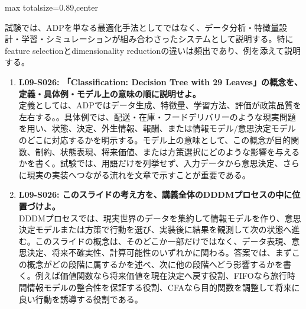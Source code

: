 \begin{minipage}[t]{0.58\textwidth}
\begin{adjustbox}{max totalsize={\textwidth}{0.89\textheight},center}
\begin{minipage}{\textwidth}
試験では、ADPを単なる最適化手法としてではなく、データ分析・特徴量設計・学習・シミュレーションが組み合わさったシステムとして説明する。特にfeature selectionとdimensionality reductionの違いは頻出であり、例を添えて説明する。\par{}\begin{enumerate}\item \textbf{L09-S026: 「Classification: Decision Tree with 29 Leaves」の概念を、定義・具体例・モデル上の意味の順に説明せよ。}\\定義としては、ADPではデータ生成、特徴量、学習方法、評価が政策品質を左右する。。具体例では、配送・在庫・フードデリバリーのような現実問題を用い、状態、決定、外生情報、報酬、または情報モデル/意思決定モデルのどこに対応するかを明示する。モデル上の意味として、この概念が目的関数、制約、状態表現、将来価値、または方策選択にどのような影響を与えるかを書く。試験では、用語だけを列挙せず、入力データから意思決定、さらに現実の実装へつながる流れを文章で示すことが重要である。\item \textbf{L09-S026: このスライドの考え方を、講義全体のDDDMプロセスの中に位置づけよ。}\\DDDMプロセスでは、現実世界のデータを集約して情報モデルを作り、意思決定モデルまたは方策で行動を選び、実装後に結果を観測して次の状態へ進む。このスライドの概念は、そのどこか一部だけではなく、データ表現、意思決定、将来不確実性、計算可能性のいずれかに関わる。答案では、まずこの概念がどの段階に属するかを述べ、次に他の段階へどう影響するかを書く。例えば価値関数なら将来価値を現在決定へ戻す役割、FIFOなら旅行時間情報モデルの整合性を保証する役割、CFAなら目的関数を調整して将来に良い行動を誘導する役割である。\end{enumerate}
\end{minipage}
\end{adjustbox}
\end{minipage}



